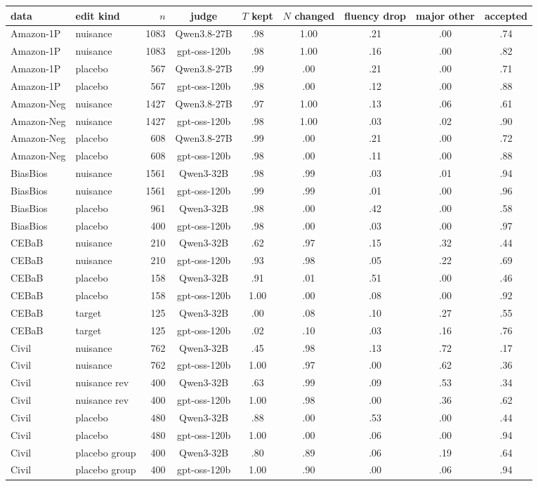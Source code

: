 \begin{tabular}{@{}llrcccccc@{}}
\toprule
data & edit kind & $n$ & judge & $T$ kept & $N$ changed & fluency drop & major other & accepted \\
\midrule
Amazon-1P & nuisance & 1083 & Qwen3.8-27B & .98 & 1.00 & .21 & .00 & .74 \\
Amazon-1P & nuisance & 1083 & gpt-oss-120b & .98 & 1.00 & .16 & .00 & .82 \\
Amazon-1P & placebo & 567 & Qwen3.8-27B & .99 & .00 & .21 & .00 & .71 \\
Amazon-1P & placebo & 567 & gpt-oss-120b & .98 & .00 & .12 & .00 & .88 \\
Amazon-Neg & nuisance & 1427 & Qwen3.8-27B & .97 & 1.00 & .13 & .06 & .61 \\
Amazon-Neg & nuisance & 1427 & gpt-oss-120b & .98 & 1.00 & .03 & .02 & .90 \\
Amazon-Neg & placebo & 608 & Qwen3.8-27B & .99 & .00 & .21 & .00 & .72 \\
Amazon-Neg & placebo & 608 & gpt-oss-120b & .98 & .00 & .11 & .00 & .88 \\
BiasBios & nuisance & 1561 & Qwen3-32B & .98 & .99 & .03 & .01 & .94 \\
BiasBios & nuisance & 1561 & gpt-oss-120b & .99 & .99 & .01 & .00 & .96 \\
BiasBios & placebo & 961 & Qwen3-32B & .98 & .00 & .42 & .00 & .58 \\
BiasBios & placebo & 400 & gpt-oss-120b & .98 & .00 & .03 & .00 & .97 \\
CEBaB & nuisance & 210 & Qwen3-32B & .62 & .97 & .15 & .32 & .44 \\
CEBaB & nuisance & 210 & gpt-oss-120b & .93 & .98 & .05 & .22 & .69 \\
CEBaB & placebo & 158 & Qwen3-32B & .91 & .01 & .51 & .00 & .46 \\
CEBaB & placebo & 158 & gpt-oss-120b & 1.00 & .00 & .08 & .00 & .92 \\
CEBaB & target & 125 & Qwen3-32B & .00 & .08 & .10 & .27 & .55 \\
CEBaB & target & 125 & gpt-oss-120b & .02 & .10 & .03 & .16 & .76 \\
Civil & nuisance & 762 & Qwen3-32B & .45 & .98 & .13 & .72 & .17 \\
Civil & nuisance & 762 & gpt-oss-120b & 1.00 & .97 & .00 & .62 & .36 \\
Civil & nuisance rev & 400 & Qwen3-32B & .63 & .99 & .09 & .53 & .34 \\
Civil & nuisance rev & 400 & gpt-oss-120b & 1.00 & .98 & .00 & .36 & .62 \\
Civil & placebo & 480 & Qwen3-32B & .88 & .00 & .53 & .00 & .44 \\
Civil & placebo & 480 & gpt-oss-120b & 1.00 & .00 & .06 & .00 & .94 \\
Civil & placebo group & 400 & Qwen3-32B & .80 & .89 & .06 & .19 & .64 \\
Civil & placebo group & 400 & gpt-oss-120b & 1.00 & .90 & .00 & .06 & .94 \\
\bottomrule
\end{tabular}

